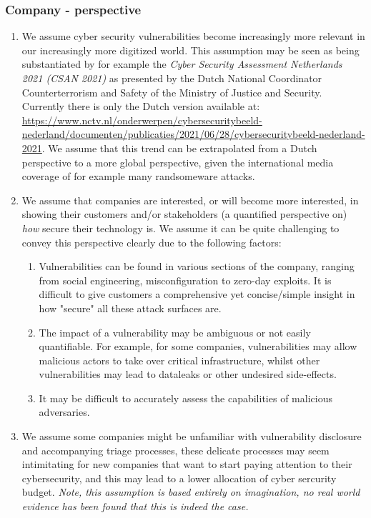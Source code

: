 \subsubsection{Company - perspective}
\begin{enumerate}
	\item We assume cyber security vulnerabilities become increasingly more relevant in our increasingly more digitized world. This assumption may be seen as being substantiated by for example the \textit{Cyber Security Assessment Netherlands 2021 (CSAN 2021)} as presented by the Dutch National Coordinator Counterterrorism and Safety of the Ministry of Justice and Security. Currently there is only the Dutch version available at: \url{https://www.nctv.nl/onderwerpen/cybersecuritybeeld-nederland/documenten/publicaties/2021/06/28/cybersecuritybeeld-nederland-2021}. We assume that this trend can be extrapolated from a Dutch perspective to a more global perspective, given the international media coverage of for example many randsomeware attacks.
	\item We assume that companies are interested, or will become more interested, in showing their customers and/or stakeholders (a quantified perspective on) \textit{how} secure their technology is. We assume it can be quite challenging to convey this perspective clearly due to the following factors:
	\begin{enumerate}
		\item Vulnerabilities can be found in various sections of the company, ranging from social engineering, misconfiguration to zero-day exploits. It is difficult to give customers a comprehensive yet concise/simple insight in how "secure" all these attack surfaces are.
		\item The impact of a vulnerability may be ambiguous or not easily quantifiable. For example, for some companies, vulnerabilities may allow malicious actors to take over critical infrastructure, whilst other vulnerabilities may lead to dataleaks or other undesired side-effects.
		\item It may be difficult to accurately assess the capabilities of malicious adversaries.
	\end{enumerate}
	\item We assume some companies might be unfamiliar with vulnerability disclosure and accompanying triage processes, these delicate processes may seem intimitating for new companies that want to start paying attention to their cybersecurity, and this may lead to a lower allocation of cyber sercurity budget. \textit{Note, this assumption is based entirely on imagination, no real world evidence has been found that this is indeed the case.}
\end{enumerate}


